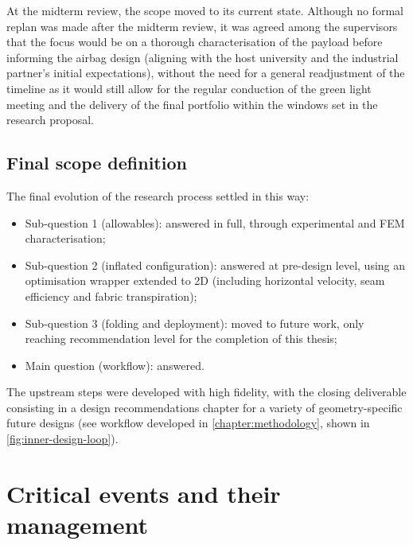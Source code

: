 At the midterm review, the scope moved to its current state. Although no formal replan was made after the midterm review, it was agreed among the supervisors that the focus would be on a thorough characterisation of the payload before informing the airbag design (aligning with the host university and the industrial partner's initial expectations), without the need for a general readjustment of the timeline as it would still allow for the regular conduction of the green light meeting and the delivery of the final portfolio within the windows set in the research proposal.

 
\subsection{Final scope definition}
The final evolution of the research process settled in this way: 
\begin{itemize}
    \item Sub-question 1 (allowables): answered in full, through experimental and FEM characterisation;
    \item Sub-question 2 (inflated configuration): answered at pre-design level, using an optimisation wrapper extended to 2D (including horizontal velocity, seam efficiency and fabric transpiration);
    \item Sub-question 3 (folding and deployment): moved to future work, only reaching recommendation level for the completion of this thesis;
    \item Main question (workflow): answered.
\end{itemize}

The upstream steps were developed with high fidelity, with the closing deliverable consisting in a design recommendations chapter for a variety of geometry-specific future designs (see workflow developed in \cref{chapter:methodology}, shown in \cref{fig:inner-design-loop}).



 
\section{Critical events and their management}
\label{sec:pm-events}
 
